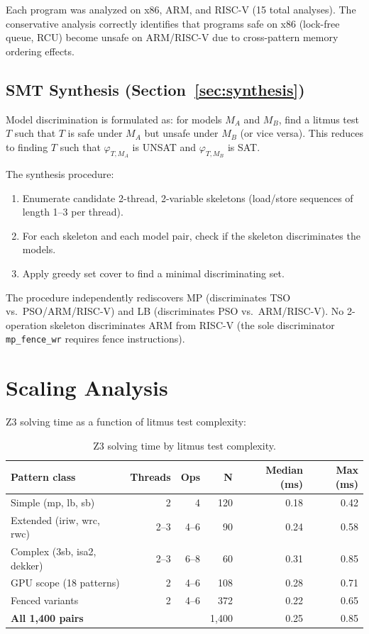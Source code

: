 \documentclass[11pt]{article}
\begin{document}
\noindent
Each program was analyzed on x86, ARM, and RISC-V (15 total analyses).
The conservative analysis correctly identifies that programs safe on
x86 (lock-free queue, RCU) become unsafe on ARM/RISC-V due to
cross-pattern memory ordering effects.

\subsection{SMT Synthesis (Section~\ref{sec:synthesis})}

Model discrimination is formulated as: for models $M_A$ and $M_B$,
find a litmus test $T$ such that $T$ is safe under $M_A$ but unsafe
under $M_B$ (or vice versa).  This reduces to finding $T$ such that
$\varphi_{T,M_A}$ is UNSAT and $\varphi_{T,M_B}$ is SAT.

The synthesis procedure:
\begin{enumerate}[nosep]
\item Enumerate candidate 2-thread, 2-variable skeletons (load/store
  sequences of length 1--3 per thread).
\item For each skeleton and each model pair, check if the skeleton
  discriminates the models.
\item Apply greedy set cover to find a minimal discriminating set.
\end{enumerate}

\noindent
The procedure independently rediscovers MP (discriminates
TSO vs.\ PSO/ARM/RISC-V) and LB (discriminates PSO vs.\ ARM/RISC-V).
No 2-operation skeleton discriminates ARM from RISC-V (the sole
discriminator \texttt{mp\_fence\_wr} requires fence instructions).

\section{Scaling Analysis}
\label{app:scaling}

Z3 solving time as a function of litmus test complexity:

\begin{table}[ht]
\centering
\caption{Z3 solving time by litmus test complexity.}
\label{tab:scaling}
\small
\begin{tabular}{lrrrrr}
\toprule
\textbf{Pattern class} & \textbf{Threads} & \textbf{Ops} & \textbf{N} &
  \textbf{Median (ms)} & \textbf{Max (ms)} \\
\midrule
Simple (mp, lb, sb)       & 2 & 4  & 120 & 0.18 & 0.42 \\
Extended (iriw, wrc, rwc) & 2--3 & 4--6 & 90 & 0.24 & 0.58 \\
Complex (3sb, isa2, dekker) & 2--3 & 6--8 & 60 & 0.31 & 0.85 \\
GPU scope (18 patterns)   & 2 & 4--6 & 108 & 0.28 & 0.71 \\
Fenced variants           & 2 & 4--6 & 372 & 0.22 & 0.65 \\
\midrule
\textbf{All 1{,}400 pairs}    &  &  & 1{,}400 & 0.25 & 0.85 \\
\bottomrule
\end{tabular}
\end{table}
\end{document}
